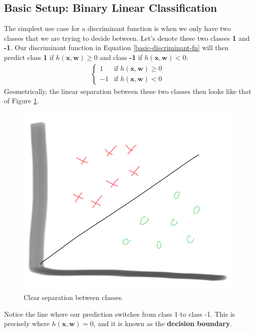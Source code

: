\subsection{Basic Setup: Binary Linear Classification}
The simplest use case for a discriminant function is when we only have two classes that we are trying to decide between. Let's denote these two classes \textbf{1} and \textbf{-1}. Our discriminant function in Equation \ref{basic-discriminant-fn} will then predict class \textbf{1} if $h(\textbf{x}, \textbf{w}) \geq 0$ and class \textbf{-1} if $h(\textbf{x}, \textbf{w}) < 0$:
\begin{align*}
	\begin{cases} 
    	1 & \text{if } h(\textbf{x}, \textbf{w}) \geq 0 \\
    	-1 & \text{if } h(\textbf{x}, \textbf{w}) < 0
   \end{cases}
\end{align*}
Geometrically, the linear separation between these two classes then looks like that of Figure \ref{fig:lin-sep-bn-classes}.
\begin{figure}
    \centering
    \includegraphics[width=0.5\paperwidth]{../Classification/fig/lin_sep_bn_classes_ipad.jpg}
    \caption{Clear separation between classes.}
    \label{fig:lin-sep-bn-classes}
\end{figure}
Notice the line where our prediction switches from class 1 to class -1. This is precisely where $h(\textbf{x}, \textbf{w}) = 0$, and it is known as the \textbf{decision boundary}.

